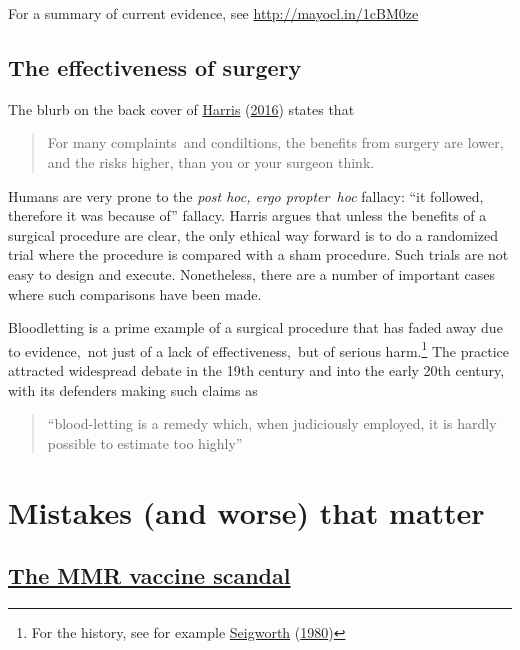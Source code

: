 \documentclass[
  10pt,
  b5paper]{book}
\begin{document}
For a summary of current evidence, see \url{http://mayocl.in/1cBM0ze}

\hypertarget{the-effectiveness-of-surgery}{%
\section{The effectiveness of surgery}\label{the-effectiveness-of-surgery}}

The blurb on the back cover of \protect\hyperlink{ref-harris2016book}{Harris} (\protect\hyperlink{ref-harris2016book}{2016}) states that

\begin{quote}
For many complaints~and condiltions, the benefits from surgery
are lower, and the risks higher, than you or your surgeon think.
\end{quote}

Humans are very prone to the \emph{post hoc, ergo propter~hoc} fallacy:
``it followed, therefore it was because of'' fallacy. Harris
argues that unless the benefits of a surgical procedure are clear,
the only ethical way forward is to do a randomized trial where
the procedure is compared with a sham procedure. Such trials
are not easy to design and execute. Nonetheless, there are a
number of important cases where such comparisons have been made.

Bloodletting is a prime example of a surgical procedure that
has faded away due to evidence,~not just of a lack of
effectiveness,~but of serious harm.\footnote{For the history, see for
  example \protect\hyperlink{ref-seigworth1980bloodletting}{Seigworth} (\protect\hyperlink{ref-seigworth1980bloodletting}{1980})} The practice attracted
widespread debate in the 19th century and into the early 20th
century, with its defenders making such claims as

\begin{quote}
``blood-letting is a remedy which, when judiciously employed, it is hardly possible to estimate too highly''
\end{quote}

\hypertarget{mistakes-and-worse-that-matter}{%
\chapter{Mistakes (and worse) that matter}\label{mistakes-and-worse-that-matter}}

\hypertarget{the-mmr-vaccine-scandal}{%
\section{\texorpdfstring{\href{https://en.wikipedia.org/wiki/MMR_vaccine_controversy}{The MMR vaccine scandal}}{The MMR vaccine scandal}}\label{the-mmr-vaccine-scandal}}
\end{document}
